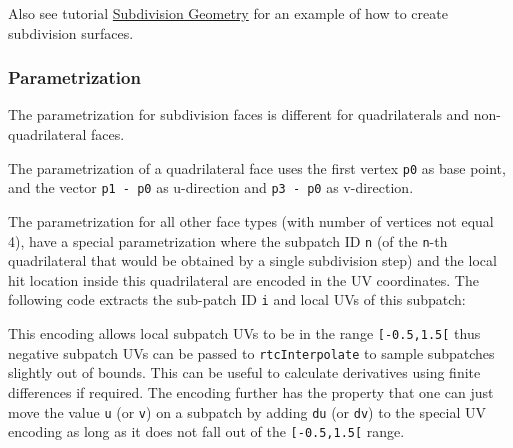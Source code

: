Also see tutorial \hyperref[subdivision-geometry]{Subdivision Geometry}
for an example of how to create subdivision surfaces.

\subsubsection{Parametrization}\label{parametrization}

The parametrization for subdivision faces is different for
quadrilaterals and non-quadrilateral faces.

The parametrization of a quadrilateral face uses the first vertex
\texttt{p0} as base point, and the vector \texttt{p1\ -\ p0} as
u-direction and \texttt{p3\ -\ p0} as v-direction.

The parametrization for all other face types (with number of vertices
not equal 4), have a special parametrization where the subpatch ID
\texttt{n} (of the \texttt{n}-th quadrilateral that would be obtained by
a single subdivision step) and the local hit location inside this
quadrilateral are encoded in the UV coordinates. The following code
extracts the sub-patch ID \texttt{i} and local UVs of this subpatch:

\begin{Shaded}
\begin{Highlighting}[]
 \OperatorTok{=}\OperatorTok{(}\OperatorTok{*}\OperatorTok{);}
 \OperatorTok{=}\OperatorTok{(}\OperatorTok{*}\OperatorTok{);}
 \OperatorTok{=} \OperatorTok{*}\OperatorTok{+}\OperatorTok{;}
\OperatorTok{=} \OperatorTok{*}\OperatorTok{(}\OperatorTok{*}\OperatorTok{){-}}\OperatorTok{;}
\OperatorTok{=} \OperatorTok{*}\OperatorTok{(}\OperatorTok{*}\OperatorTok{){-}}\OperatorTok{;}
\end{Highlighting}
\end{Shaded}

This encoding allows local subpatch UVs to be in the range
\texttt{{[}-0.5,1.5{[}} thus negative subpatch UVs can be passed to
\texttt{rtcInterpolate} to sample subpatches slightly out of bounds.
This can be useful to calculate derivatives using finite differences if
required. The encoding further has the property that one can just move
the value \texttt{u} (or \texttt{v}) on a subpatch by adding \texttt{du}
(or \texttt{dv}) to the special UV encoding as long as it does not fall
out of the \texttt{{[}-0.5,1.5{[}} range.


